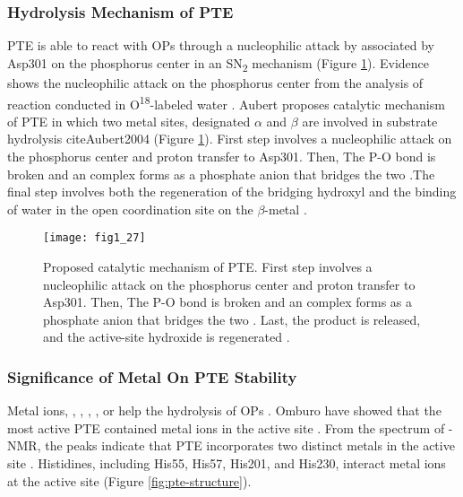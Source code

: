 \begin{refsection}
\subsubsection{Hydrolysis Mechanism of PTE}

PTE is able to react with OPs through a nucleophilic attack by 
associated by Asp301 on the phosphorus center in an SN\textsubscript{2}
mechanism \cite{Lewis1988} (Figure \ref{fig:pte-mechanism}).  Evidence shows the
nucleophilic attack on the phosphorus center from the analysis of reaction
conducted in O\textsuperscript{18}-labeled water \cite{Lewis1988}.  Aubert
 proposes catalytic mechanism of PTE in which two metal sites,
designated $\alpha$ and $\beta$ are involved in substrate hydrolysis
cite{Aubert2004} (Figure \ref{fig:pte-mechanism}). First step involves a
nucleophilic attack on the phosphorus center and proton transfer to Asp301.
Then, The P-O bond is broken and an complex forms as a phosphate anion that
bridges the two .The final step involves both the regeneration of
the bridging hydroxyl and the binding of water in the open coordination site on
the $\beta$-metal \cite{Aubert2004}.
\begin{figure}[htbp] \centering \texttt{[image: fig1\_27]}
    \caption[Proposed catalytic mechanism of PTE. First step involves a
    nucleophilic attack on the phosphorus center and proton transfer to Asp301.
Then, The P-O bond is broken and an complex forms as a phosphate anion that
bridges the two . Last, the product is released, and the
active-site hydroxide is regenerated.]{Proposed catalytic mechanism of PTE.
    First step involves a nucleophilic attack on the phosphorus center and
    proton transfer to Asp301. Then, The P-O bond is broken and an complex
    forms as a phosphate anion that bridges the two . Last, the
    product is released, and the active-site hydroxide is regenerated
    \cite{Aubert2004}.} \label{fig:pte-mechanism} \end{figure}

\subsubsection{Significance of Metal On PTE Stability}

Metal ions, , , , , or
 help the hydrolysis of OPs
\cite{Rochu2002b,Carletti2009,Hill2003,Bigley2013,Samples2005,Kim2008}. Omburo
 have showed that the most active PTE contained  metal
ions in the active site \cite{Omburo1992a}. From the spectrum of
-NMR, the peaks indicate that PTE incorporates two distinct metals
in the active site \cite{Omburo1993}.  Histidines, including His55, His57,
His201, and His230, interact metal ions at the active site \cite{Benning2001a}
(Figure \ref{fig:pte-structure}). 


\end{refsection}
